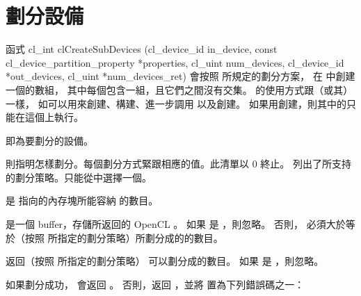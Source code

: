 \section{劃分設備}
函式
\startclc[indentnext=no]
cl_int clCreateSubDevices (cl_device_id in_device,
			   const cl_device_partition_property *properties,
			   cl_uint num_devices,
			   cl_device_id *out_devices,
			   cl_uint *num_devices_ret)
\stopclc
會按照  所規定的劃分方案，
在  中創建一個的數組，
其中每個包含一組，且它們之間沒有交集。
的使用方式跟（或其）一樣，
如可以用來創建、構建、進一步調用  以及創建。
如果用創建，則其中的只能在這個上執行。

 即為要劃分的設備。

 則指明怎樣劃分。每個劃分方式緊跟相應的值。此清單以 0 終止。
列出了所支持的劃分策略。只能從中選擇一個。

{}

 是  指向的內存塊所能容納  的數目。

 是一個 buffer，存儲所返回的 OpenCL 。
如果  是 ，則忽略。
否則，  必須大於等於（按照  所指定的劃分策略）所劃分成的的數目。

 返回（按照  所指定的劃分策略） 可以劃分成的數目。
如果  是 ，則忽略。

如果劃分成功，  會返回 。
否則，返回 ，並將  置為下列錯誤碼之一：

